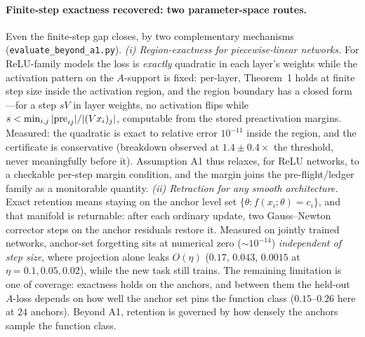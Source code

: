 \documentclass[10pt,a4paper]{article}
\theoremstyle{plain}
\theoremstyle{definition}
\begin{document}
\paragraph{Finite-step exactness recovered: two parameter-space routes.} Even the
finite-step gap closes, by two complementary mechanisms
(\texttt{evaluate\_beyond\_a1.py}). \emph{(i) Region-exactness for piecewise-linear
networks.} For ReLU-family models the loss is \emph{exactly} quadratic in each layer's
weights while the activation pattern on the $A$-support is fixed: per-layer, Theorem~1
holds at finite step size inside the activation region, and the region boundary has a
closed form---for a step $sV$ in layer weights, no activation flips while
$s<\min_{i,j}|{\rm pre}_{ij}|/|(Vx_i)_j|$, computable from the stored preactivation
margins. Measured: the quadratic is exact to relative error $10^{-11}$ inside the region,
and the certificate is conservative (breakdown observed at $1.4\pm0.4\times$ the
threshold, never meaningfully before it). Assumption A1 thus relaxes, for ReLU networks,
to a checkable per-step margin condition, and the margin joins the pre-flight/ledger
family as a monitorable quantity. \emph{(ii) Retraction for any smooth architecture.}
Exact retention means staying on the anchor level set
$\{\theta: f(x_i;\theta)=c_i\}$, and that manifold is returnable: after each ordinary
update, two Gauss--Newton corrector steps on the anchor residuals restore it. Measured on
jointly trained networks, anchor-set forgetting sits at numerical zero
($\sim10^{-14}$) \emph{independent of step size}, where projection alone leaks $O(\eta)$
($0.17$, $0.043$, $0.0015$ at $\eta=0.1,0.05,0.02$), while the new task still trains.
The remaining limitation is one of coverage: exactness
holds on the anchors, and between them the held-out $A$-loss depends on how well the anchor
set pins the function class ($0.15$--$0.26$ here at $24$ anchors). Beyond A1, retention
is governed by how densely the anchors sample the function class.
\end{document}
